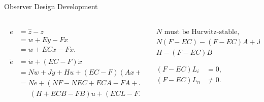 \begin{slide}{Observer Design Development}
  \begin{columns}[c]
    \begin{column}{0.55\textwidth}
      \begin{align}
        \begin{split}
          e & = \hat{z} - z   \\
          & = w + Ey - Fx   \\
          & = w + ECx - Fx.
        \end{split} \\
        \begin{split}
          \dot{e} & = \dot{w} + (EC-F)\dot{x}              \\
          & = Nw + Jy + Hu + (EC-F)(Ax + Bu + Lf)  \\
          & = Ne + (NF-NEC+ECA-FA+JC)x +           \\
          & \phantom{=~} (H+ECB-FB)u + (ECL-FL)f.
        \end{split}
      \end{align}
    \end{column}%
    \hfill%
    \begin{column}{0.55\textwidth}
      \begin{align}
        \begin{split}
          N \textrm{ must be Hurwitz-stable}, &      \\
          N(F-EC)-(F-EC)A+JC                  & = 0, \\
          H-(F-EC)B                           & = 0.
        \end{split} \\\nonumber\\
        \begin{split}
          (F-EC)L_{i} & = 0,     \\
          (F-EC)L_{n} & \neq 0.
        \end{split}
      \end{align}
    \end{column}%
  \end{columns}
\end{slide}

